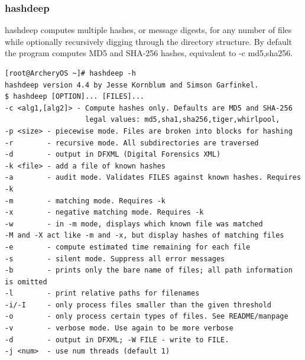 \documentclass{article}
\begin{document}
\subsubsection{hashdeep}
hashdeep computes multiple hashes, or message digests, for any number  of  files while  optionally  recursively digging through the directory structure. By default the program computes MD5 and SHA-256 hashes,  equivalent  to -c  md5,sha256.
\begin{lstlisting}
[root@ArcheryOS ~]# hashdeep -h
hashdeep version 4.4 by Jesse Kornblum and Simson Garfinkel.
$ hashdeep [OPTION]... [FILES]...
-c <alg1,[alg2]> - Compute hashes only. Defaults are MD5 and SHA-256
                   legal values: md5,sha1,sha256,tiger,whirlpool,
-p <size> - piecewise mode. Files are broken into blocks for hashing
-r        - recursive mode. All subdirectories are traversed
-d        - output in DFXML (Digital Forensics XML)
-k <file> - add a file of known hashes
-a        - audit mode. Validates FILES against known hashes. Requires -k
-m        - matching mode. Requires -k
-x        - negative matching mode. Requires -k
-w        - in -m mode, displays which known file was matched
-M and -X act like -m and -x, but display hashes of matching files
-e        - compute estimated time remaining for each file
-s        - silent mode. Suppress all error messages
-b        - prints only the bare name of files; all path information is omitted
-l        - print relative paths for filenames
-i/-I     - only process files smaller than the given threshold
-o        - only process certain types of files. See README/manpage
-v        - verbose mode. Use again to be more verbose
-d        - output in DFXML; -W FILE - write to FILE.
-j <num>  - use num threads (default 1)
\end{lstlisting}
\end{document}
